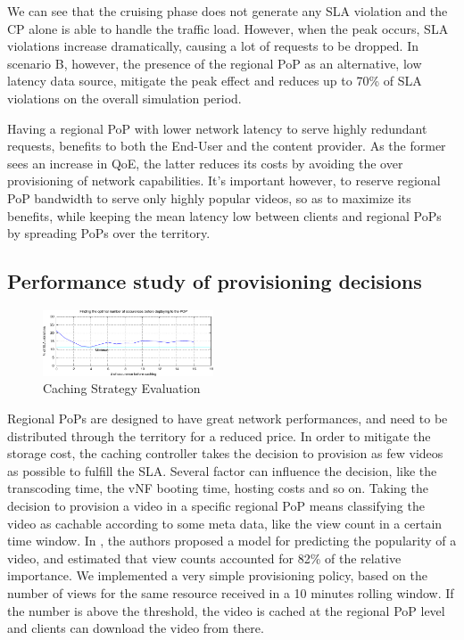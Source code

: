 We can see that the cruising phase does not generate any SLA violation and the CP alone is able to handle the traffic load. However, when the peak occurs, SLA violations increase dramatically, causing a lot of requests to be dropped. In scenario B, however, the presence of the regional PoP as an alternative, low latency data source, mitigate the peak effect and reduces up to 70\% of SLA violations on the overall simulation period.

Having a regional PoP with lower network latency to serve highly redundant requests, benefits to both the End-User and the content provider. As the former sees an increase in QoE, the latter reduces its costs by avoiding the over provisioning of network capabilities. It's important however, to reserve regional PoP bandwidth to serve only highly popular videos, so as to maximize its benefits, while keeping the mean latency low between clients and regional PoPs by spreading PoPs over the territory.

\subsection{Performance study of provisioning decisions} \label{provisionningdecisions}


\begin{figure}
	
 \begin{center}
    \includegraphics[width=0.45\textwidth]{fig/cachingStrat_evaluation.pdf}
  \end{center}
  \caption{ Caching Strategy Evaluation
    \label{fig:cachingstrateval}
  }
\end{figure}	

Regional PoPs are designed to have great network performances, and need to be distributed through the territory for a reduced price.
In order to mitigate the storage cost, the caching controller takes the decision to provision as few videos as possible to fulfill the SLA. Several factor can influence the decision, like the transcoding time, the vNF booting time, hosting costs and so on.
Taking the decision to provision a video in a specific regional PoP means classifying the video as cachable according to some meta data, like the view count in a certain time window.
In \cite{silvestre_boosting_2015}, the authors proposed a model for predicting the popularity of a video, and estimated that view counts accounted for 82\% of the relative importance. 
We implemented a very simple provisioning policy, based on the number of views for the same resource received in a 10 minutes rolling window. If the number is above the threshold, the video is cached at the regional PoP level and clients can download the video from there.


